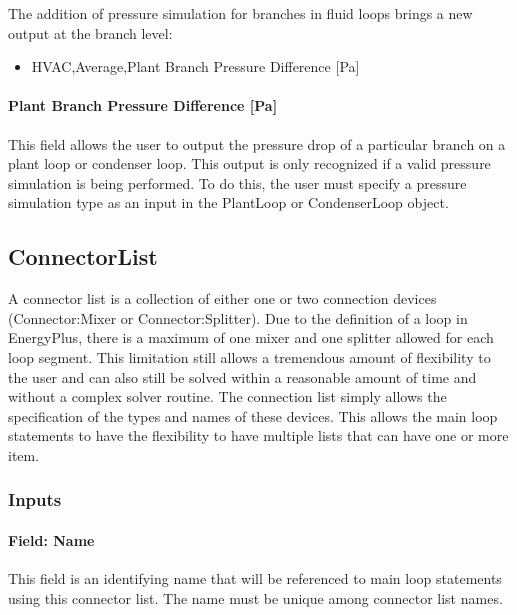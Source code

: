 The addition of pressure simulation for branches in fluid loops brings a new output at the branch level:

\begin{itemize}
\tightlist
\item
  HVAC,Average,Plant Branch Pressure Difference {[}Pa{]}
\end{itemize}

\paragraph{Plant Branch Pressure Difference {[}Pa{]}}\label{plant-branch-pressure-difference-pa}

This field allows the user to output the pressure drop of a particular branch on a plant loop or condenser loop. This output is only recognized if a valid pressure simulation is being performed. To do this, the user must specify a pressure simulation type as an input in the PlantLoop or CondenserLoop object.

\subsection{ConnectorList}\label{connectorlist}

A connector list is a collection of either one or two connection devices (Connector:Mixer or Connector:Splitter). Due to the definition of a loop in EnergyPlus, there is a maximum of one mixer and one splitter allowed for each loop segment. This limitation still allows a tremendous amount of flexibility to the user and can also still be solved within a reasonable amount of time and without a complex solver routine. The connection list simply allows the specification of the types and names of these devices. This allows the main loop statements to have the flexibility to have multiple lists that can have one or more item.

\subsubsection{Inputs}\label{inputs-3-021}

\paragraph{Field: Name}\label{field-name-3-019}

This field is an identifying name that will be referenced to main loop statements using this connector list. The name must be unique among connector list names.

